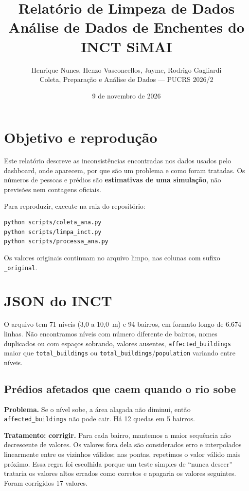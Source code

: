 \documentclass[11pt,a4paper]{article}
\title{Relatório de Limpeza de Dados\\\large Análise de Dados de Enchentes do INCT SiMAI}
\author{Henrique Nunes, Henzo Vasconcellos, Jayme, Rodrigo Gagliardi\\Coleta, Preparação e Análise de Dados --- PUCRS 2026/2}
\date{9 de novembro de 2026}
\begin{document}
\maketitle

\section{Objetivo e reprodução}
Este relatório descreve as inconsistências encontradas nos dados usados pelo dashboard, onde aparecem, por que são um problema e como foram tratadas. Os números de pessoas e prédios são \textbf{estimativas de uma simulação}, não previsões nem contagens oficiais.

Para reproduzir, execute na raiz do repositório:
\begin{verbatim}
python scripts/coleta_ana.py
python scripts/limpa_inct.py
python scripts/processa_ana.py
\end{verbatim}
Os valores originais continuam no arquivo limpo, nas colunas com sufixo \texttt{\_original}.

\section{JSON do INCT}
O arquivo tem 71 níveis (3,0 a 10,0~m) e 94 bairros, em formato longo de 6.674 linhas. Não encontramos níveis com número diferente de bairros, nomes duplicados ou com espaços sobrando, valores ausentes, \texttt{affected\_buildings} maior que \texttt{total\_buildings} ou \texttt{total\_buildings}/\texttt{population} variando entre níveis.

\subsection{Prédios afetados que caem quando o rio sobe}
\textbf{Problema.} Se o nível sobe, a área alagada não diminui, então \texttt{affected\_buildings} não pode cair. Há 12 quedas em 5 bairros.

\textbf{Tratamento: corrigir.} Para cada bairro, mantemos a maior sequência não decrescente de valores. Os valores fora dela são considerados erro e interpolados linearmente entre os vizinhos válidos; nas pontas, repetimos o valor válido mais próximo. Essa regra foi escolhida porque um teste simples de ``nunca descer'' trataria os valores altos errados como corretos e apagaria os valores seguintes. Foram corrigidos 17 valores.
\end{document}
